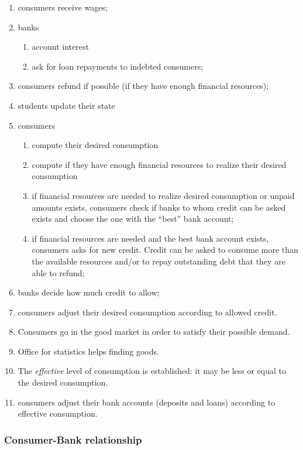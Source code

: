 \documentclass{article}
\begin{document}
\begin{enumerate}
	\item consumers receive wages;
	\item banks 
		\begin{enumerate}
			\item account interest
			\item ask for loan repayments to indebted consumers;
		\end{enumerate}
	\item consumers refund if possible (if they have enough financial resources);
	\item students update their state
	\item consumers 
		\begin{enumerate}
			\item compute their desired consumption
			\item compute if they have enough financial resources to realize their desired consumption
			\item if financial resources are needed to realize desired consumption or unpaid amounts exists, consumers check if banks to whom credit can be asked exists and choose the one with the ``best'' bank account;
			\item if financial resources are needed and the best bank account exists, consumers asks for new credit. Credit can be asked to consume more than the available resources and/or to repay outstanding debt that they are able to refund;
		\end{enumerate}
	\item banks decide how much credit to allow;
	\item consumers adjust their desired consumption according to allowed credit. 
	\item Consumers go in the good market in order to satisfy their possible demand.
	\item Office for statistics helps finding goods.
	\item The \textit{effective} level of consumption is established: it may be less or equal to the desired consumption.
	\item consumers adjust their bank accounts (deposits and loans) according to effective consumption.
\end{enumerate}

\subsubsection{Consumer-Bank relationship}
\end{document}
